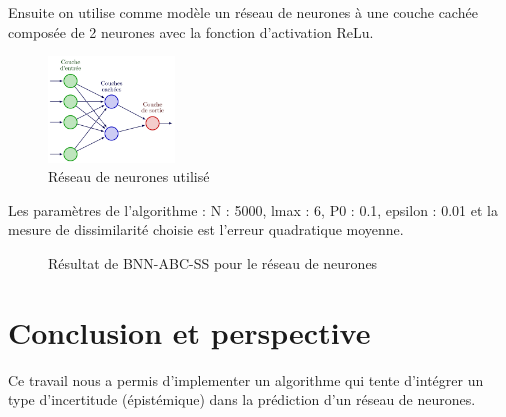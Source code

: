 \documentclass[french,12pt]{article}
\let\oldsection\section%
\renewcommand{\section}{%
  \renewcommand{\theequation}{\thesection.\arabic{equation}}%
  \oldsection}%
\begin{document}
Ensuite on utilise comme modèle un réseau de neurones à une couche cachée composée de 2 neurones
avec la fonction d'activation ReLu.

\begin{figure}[H]
    \centering
    \includegraphics[width = 0.3\textwidth]{FNN/Images/fnnTemp.jpg}
    \caption[short]{Réseau de neurones utilisé}
\end{figure}

Les paramètres de l'algorithme :
N : 5000,
lmax : 6,
P0 : 0.1,
epsilon : 0.01 et
la mesure de dissimilarité choisie est l'erreur quadratique moyenne.

\begin{figure}[H]
    \centering
    \caption{Résultat de BNN-ABC-SS pour le réseau de neurones}
\end{figure}

\pagebreak
\section{Conclusion et perspective}
Ce travail nous a permis d'implementer un algorithme qui tente d'intégrer
un type d'incertitude (épistémique) dans la prédiction d'un réseau de
neurones.
\end{document}
